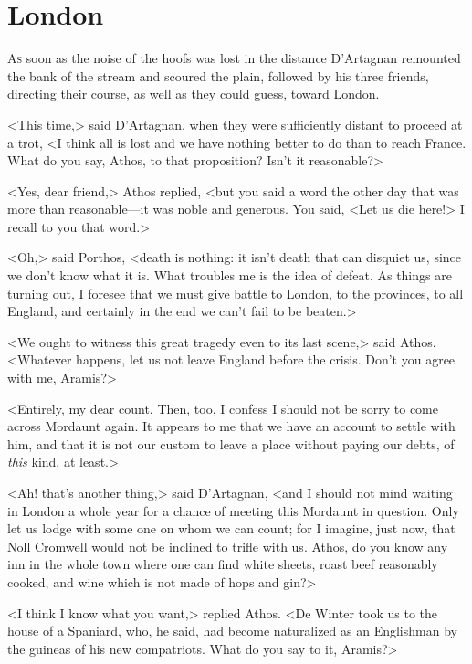 \chapter{London}

 \lettrine{A}{s} soon as the noise of the hoofs was lost in the distance D'Artagnan remounted the bank of the stream and scoured the plain, followed by his three friends, directing their course, as well as they could guess, toward London.

\zz
<This time,> said D'Artagnan, when they were sufficiently distant to proceed at a trot, <I think all is lost and we have nothing better to do than to reach France. What do you say, Athos, to that proposition? Isn't it reasonable?>

<Yes, dear friend,> Athos replied, <but you said a word the other day that was more than reasonable—it was noble and generous. You said, <Let us die here!> I recall to you that word.>

<Oh,> said Porthos, <death is nothing: it isn't death that can disquiet us, since we don't know what it is. What troubles me is the idea of defeat. As things are turning out, I foresee that we must give battle to London, to the provinces, to all England, and certainly in the end we can't fail to be beaten.>

<We ought to witness this great tragedy even to its last scene,> said Athos. <Whatever happens, let us not leave England before the crisis. Don't you agree with me, Aramis?>

<Entirely, my dear count. Then, too, I confess I should not be sorry to come across Mordaunt again. It appears to me that we have an account to settle with him, and that it is not our custom to leave a place without paying our debts, of \textit{this} kind, at least.>

<Ah! that's another thing,> said D'Artagnan, <and I should not mind waiting in London a whole year for a chance of meeting this Mordaunt in question. Only let us lodge with some one on whom we can count; for I imagine, just now, that Noll Cromwell would not be inclined to trifle with us. Athos, do you know any inn in the whole town where one can find white sheets, roast beef reasonably cooked, and wine which is not made of hops and gin?>

<I think I know what you want,> replied Athos. <De Winter took us to the house of a Spaniard, who, he said, had become naturalized as an Englishman by the guineas of his new compatriots. What do you say to it, Aramis?>

